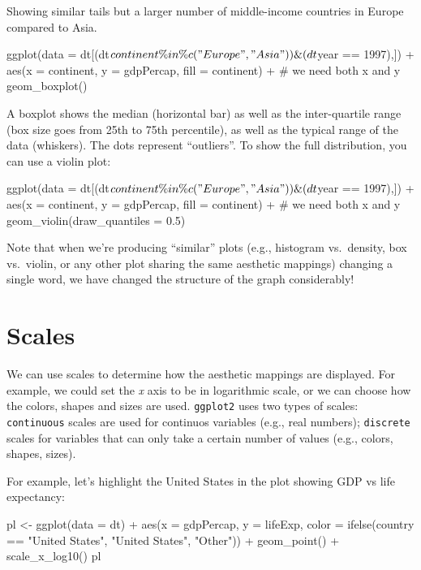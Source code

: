 \documentclass[
  letterpaper,
  DIV=11,
  numbers=noendperiod]{scrreprt}
\newenvironment{Shaded}{\begin{snugshade}}{\end{snugshade}}
\newcommand{\NormalTok}[1]{\textcolor[rgb]{0.00,0.23,0.31}{#1}}
\begin{document}
Showing similar tails but a larger number of middle-income countries in
Europe compared to Asia.

\begin{Shaded}
\begin{Highlighting}[]
\NormalTok{ggplot(data = dt[(dt$continent \%in\% c("Europe", "Asia")) \& (dt$year == 1997),]) + }
\NormalTok{  aes(x = continent, y = gdpPercap, fill = continent) + \# we need both x and y}
\NormalTok{  geom\_boxplot() }
\end{Highlighting}
\end{Shaded}

A boxplot shows the median (horizontal bar) as well as the
inter-quartile range (box size goes from 25th to 75th percentile), as
well as the typical range of the data (whiskers). The dots represent
``outliers''. To show the full distribution, you can use a violin plot:

\begin{Shaded}
\begin{Highlighting}[]
\NormalTok{ggplot(data = dt[(dt$continent \%in\% c("Europe", "Asia")) \& (dt$year == 1997),]) + }
\NormalTok{  aes(x = continent, y = gdpPercap, fill = continent) + \# we need both x and y}
\NormalTok{  geom\_violin(draw\_quantiles = 0.5) }
\end{Highlighting}
\end{Shaded}

Note that when we're producing ``similar'' plots (e.g., histogram
vs.~density, box vs.~violin, or any other plot sharing the same
aesthetic mappings) changing a single word, we have changed the
structure of the graph considerably!

\section{Scales}\label{scales}

We can use scales to determine how the aesthetic mappings are displayed.
For example, we could set the \emph{x} axis to be in logarithmic scale,
or we can choose how the colors, shapes and sizes are used.
\texttt{ggplot2} uses two types of scales: \texttt{continuous} scales
are used for continuos variables (e.g., real numbers); \texttt{discrete}
scales for variables that can only take a certain number of values
(e.g., colors, shapes, sizes).

For example, let's highlight the United States in the plot showing GDP
vs life expectancy:

\begin{Shaded}
\begin{Highlighting}[]
\NormalTok{pl \textless{}{-} ggplot(data = dt) + }
\NormalTok{  aes(x = gdpPercap, y = lifeExp, color = ifelse(country == "United States", "United States", "Other")) +}
\NormalTok{  geom\_point() + }
\NormalTok{  scale\_x\_log10() }
\NormalTok{pl}
\end{Highlighting}
\end{Shaded}
\end{document}
